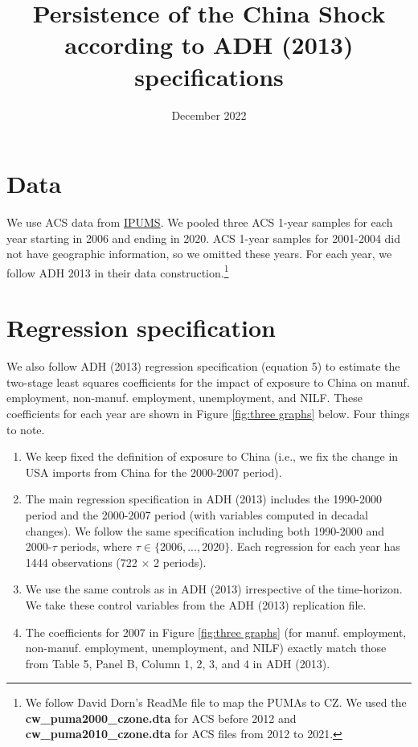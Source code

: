 \documentclass[12pt]{article}
\title{Persistence of the China Shock according to ADH (2013) specifications}
\date{December 2022}
\begin{document}
\maketitle

\section*{Data}

We use ACS data from \href{https://usa.ipums.org/usa/}{IPUMS}. We pooled three ACS 1-year samples for each year starting in 2006 and ending in 2020.  ACS 1-year samples for 2001-2004 did not have geographic information, so we omitted these years. For each year, we follow ADH 2013 in their data construction.\footnote{We follow David Dorn's ReadMe file to map the PUMAs to CZ. We used the \textbf{cw\_puma2000\_czone.dta} for ACS before 2012 and \textbf{cw\_puma2010\_czone.dta} for ACS files from 2012 to 2021.} 

\section*{Regression specification}


We also follow ADH (2013) regression specification (equation 5) to estimate the two-stage least squares coefficients for the impact of exposure to China on manuf. employment, non-manuf. employment, unemployment, and NILF. These coefficients for each year are shown in Figure \ref{fig:three graphs} below. Four things to note. 

\begin{enumerate}
\item We keep fixed the definition of exposure to China (i.e., we fix the change in USA imports from China for the 2000-2007 period).  
\item The main regression specification in ADH (2013) includes the 1990-2000 period and the 2000-2007 period (with variables computed in decadal changes). We follow the same specification including both 1990-2000 and 2000-$\tau$ periods, where $\tau \in \{ 2006,..., 2020 \}$. Each regression for each year has 1444 observations (722 $\times$ 2 periods). 
\item We use the same controls as in ADH (2013) irrespective of the time-horizon. We take these control variables from the ADH (2013) replication file.
\item The coefficients for 2007 in Figure \ref{fig:three graphs} (for manuf. employment, non-manuf. employment, unemployment, and NILF) exactly match those from Table 5, Panel B, Column 1, 2, 3, and 4 in ADH (2013). 
\end{enumerate}
\end{document}
